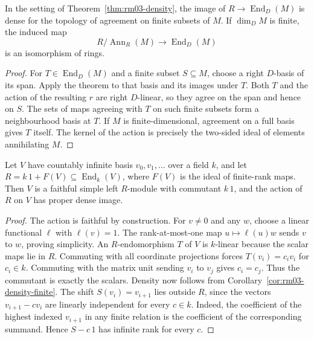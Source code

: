 \begin{corollary}
\label{cor:rm03-density-finite}
In the setting of Theorem~\ref{thm:rm03-density}, the image of
\(R\to\operatorname{End}_D(M)\) is dense for the topology of agreement
on finite subsets of \(M\). If \(\dim_D M\) is finite, the induced map
\[
      R/\operatorname{Ann}_R(M)\longrightarrow\operatorname{End}_D(M)
\]
is an isomorphism of rings.
\end{corollary}
\begin{proof}
For \(T\in\operatorname{End}_D(M)\) and a finite subset \(S\subseteq M\),
choose a right \(D\)-basis of its span. Apply the theorem to that basis
and its images under \(T\). Both \(T\) and the action of the resulting
\(r\) are right \(D\)-linear, so they agree on the span and hence on
\(S\). The sets of maps agreeing with \(T\) on such finite subsets
form a neighbourhood basis at \(T\). If \(M\) is finite-dimensional,
agreement on a full basis gives \(T\) itself. The kernel of the action
is precisely the two-sided ideal of elements annihilating \(M\).
\end{proof}

\begin{example}
\label{ex:rm03-density-proper}
Let \(V\) have countably infinite basis \(v_0,v_1,\ldots\) over a
field \(k\), and let \(R=k\,1+F(V)\subseteq\operatorname{End}_k(V)\),
where \(F(V)\) is the ideal of finite-rank maps. Then \(V\) is a
faithful simple left \(R\)-module with commutant \(k\,1\), and the
action of \(R\) on \(V\) has proper dense image.
\end{example}
\begin{proof}
The action is faithful by construction. For \(v\ne0\) and any \(w\),
choose a linear functional \(\ell\) with \(\ell(v)=1\). The rank-at-most-one
map \(u\mapsto\ell(u)w\) sends \(v\) to \(w\), proving simplicity.
An \(R\)-endomorphism \(T\) of \(V\) is \(k\)-linear because the scalar
maps lie in \(R\). Commuting with all coordinate projections forces
\(T(v_i)=c_i v_i\) for \(c_i\in k\). Commuting with the matrix unit
sending \(v_i\) to \(v_j\) gives \(c_i=c_j\). Thus the commutant is
exactly the scalars. Density now follows from
Corollary~\ref{cor:rm03-density-finite}. The shift \(S(v_i)=v_{i+1}\)
lies outside \(R\), since the vectors \(v_{i+1}-c v_i\) are linearly
independent for every \(c\in k\). Indeed, the coefficient of the
highest indexed \(v_{i+1}\) in any finite relation is the coefficient
of the corresponding summand. Hence \(S-c\,1\) has infinite rank for
every \(c\).
\end{proof}
